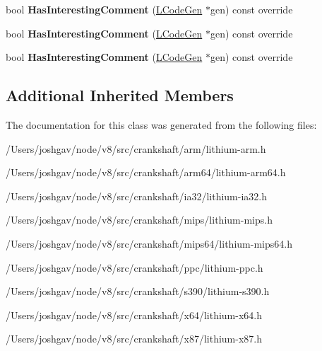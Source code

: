 \begin{DoxyCompactItemize}
\item 
bool {\bfseries Has\+Interesting\+Comment} (\hyperlink{classv8_1_1internal_1_1_l_code_gen}{L\+Code\+Gen} $\ast$gen) const  override\hypertarget{classv8_1_1internal_1_1_l_unknown_o_s_r_value_a7bfc1db9b888b5300f258abf014a6860}{}\label{classv8_1_1internal_1_1_l_unknown_o_s_r_value_a7bfc1db9b888b5300f258abf014a6860}

\item 
bool {\bfseries Has\+Interesting\+Comment} (\hyperlink{classv8_1_1internal_1_1_l_code_gen}{L\+Code\+Gen} $\ast$gen) const  override\hypertarget{classv8_1_1internal_1_1_l_unknown_o_s_r_value_a7bfc1db9b888b5300f258abf014a6860}{}\label{classv8_1_1internal_1_1_l_unknown_o_s_r_value_a7bfc1db9b888b5300f258abf014a6860}

\item 
bool {\bfseries Has\+Interesting\+Comment} (\hyperlink{classv8_1_1internal_1_1_l_code_gen}{L\+Code\+Gen} $\ast$gen) const  override\hypertarget{classv8_1_1internal_1_1_l_unknown_o_s_r_value_a7bfc1db9b888b5300f258abf014a6860}{}\label{classv8_1_1internal_1_1_l_unknown_o_s_r_value_a7bfc1db9b888b5300f258abf014a6860}

\end{DoxyCompactItemize}
\subsection*{Additional Inherited Members}


The documentation for this class was generated from the following files\+:\begin{DoxyCompactItemize}
\item 
/\+Users/joshgav/node/v8/src/crankshaft/arm/lithium-\/arm.\+h\item 
/\+Users/joshgav/node/v8/src/crankshaft/arm64/lithium-\/arm64.\+h\item 
/\+Users/joshgav/node/v8/src/crankshaft/ia32/lithium-\/ia32.\+h\item 
/\+Users/joshgav/node/v8/src/crankshaft/mips/lithium-\/mips.\+h\item 
/\+Users/joshgav/node/v8/src/crankshaft/mips64/lithium-\/mips64.\+h\item 
/\+Users/joshgav/node/v8/src/crankshaft/ppc/lithium-\/ppc.\+h\item 
/\+Users/joshgav/node/v8/src/crankshaft/s390/lithium-\/s390.\+h\item 
/\+Users/joshgav/node/v8/src/crankshaft/x64/lithium-\/x64.\+h\item 
/\+Users/joshgav/node/v8/src/crankshaft/x87/lithium-\/x87.\+h\end{DoxyCompactItemize}
